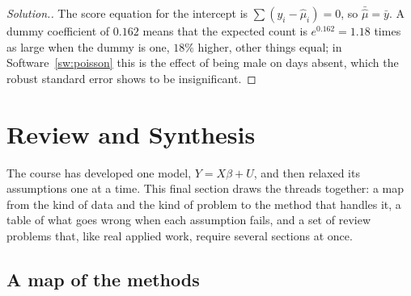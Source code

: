 \documentclass[11pt,a4paper]{article}
\numberwithin{equation}{section}
\theoremstyle{definition}
\newenvironment{solution}
  {\renewcommand{\qedsymbol}{}\begin{proof}[\textit{Solution}.]}
  {\end{proof}}
\begin{document}
\begin{solution}
The score equation for the intercept is $\sum(y_i - \hat\mu_i) = 0$, so $\bar{\hat\mu} = \bar y$. A dummy coefficient of $0.162$ means that the expected count is $e^{0.162} = 1.18$ times as large
when the dummy is one, $18\%$ higher, other things equal; in Software~\ref{sw:poisson} this is the effect of being male on days absent, which the robust standard error shows to be
insignificant.
\end{solution}

\section{Review and Synthesis}
\label{sec:review}

The course has developed one model, $Y = X\beta + U$, and then relaxed its assumptions one at a time. This final section draws the threads
together: a map from the kind of data and the kind of problem to the method that handles it, a table of what goes wrong when each assumption
fails, and a set of review problems that, like real applied work, require several sections at once.

\subsection{A map of the methods}
\label{ssec:map}
\end{document}
